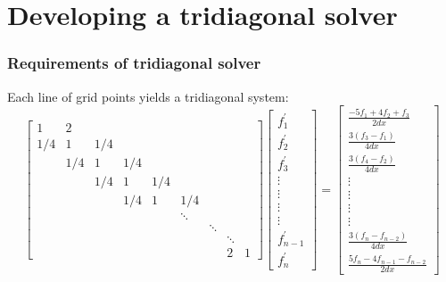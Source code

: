 \section{Developing a tridiagonal solver}

\begin{frame}
\frametitle{Requirements of tridiagonal solver}

Each line of grid points yields a tridiagonal system:
\small
\begin{equation*}
 \begin{bmatrix}
     1&2\\
     1/4&1&1/4\\
     &1/4&1&1/4\\
     &&1/4&1&1/4\\
     &&&1/4&1&1/4\\
     &&&&&\ddots\\
     &&&&&&\ddots\\
     &&&&&&&\ddots\\
     &&&&&&&2&1
  \end{bmatrix}
  \begin{bmatrix}
      f^{\prime}_1 \\
      f^{\prime}_2 \\
      f^{\prime}_3 \\
      \vdots \\
      \vdots \\
      \vdots \\
      \vdots \\
      f^{\prime}_{n-1} \\
      f^{\prime}_n
   \end{bmatrix}
 =
 \begin{bmatrix}
     \frac{-5f_1 + 4f_2 + f_3}{2dx}\\
     \frac{3(f_{3} - f_{1})}{4dx}\\
     \frac{3(f_{4} - f_{2})}{4dx}\\
     \vdots\\
     \vdots\\
     \vdots\\
     \vdots\\
     \frac{3(f_{n} - f_{n-2})}{4dx}\\
     \frac{5f_{n} - 4f_{n-1} - f_{n-2}}{2dx}
  \end{bmatrix}
\end{equation*}
\end{frame}


